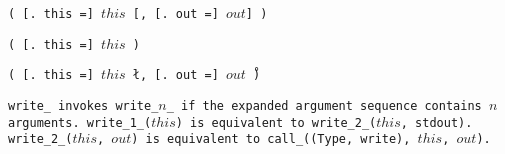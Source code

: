 
\s\s\s\tt{(} [\tt{. this =}]
$this$ [\tt{,} [\tt{. out =}] $out$] \tt{)}

\s\tt{(} [\tt{. this =}] $this$ \tt{)}

\s\tt{(} [\tt{. this =}] $this$
\l\tt{,} [\tt{. out =}] $out$\r\ \tt{)}


\tt{write_} invokes \tt{write_}$n$\_ if the
expanded argument sequence contains $n$ arguments.
\tt{write_1_(}$this$\tt{)} is equivalent to \tt{write_2_(}$this$\tt{, stdout)}.
\tt{write_2_(}$this$\tt{,} $out$\tt{)} is equivalent
to \tt{call_((Type, write),} $this$\tt{,} $out$\tt{)}.
